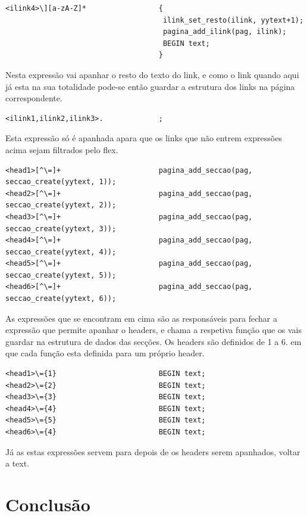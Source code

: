 \documentclass[11pt, a4paper, oneside]{article}
\begin{document}
\begin{verbatim}
<ilink4>\][a-zA-Z]*                 {
                                     ilink_set_resto(ilink, yytext+1);
                                     pagina_add_ilink(pag, ilink);
                                     BEGIN text;
                                    }
\end{verbatim}

Nesta expressão vai apanhar o resto do texto do link, e como o link quando aqui já esta na sua totalidade pode-se então guardar a estrutura dos links na página correspondente.


\begin{verbatim}
<ilink1,ilink2,ilink3>.             ;
\end{verbatim}
Esta expressão só é apanhada apara que os links que não entrem expressões acima sejam filtrados pelo flex. 



\begin{verbatim}
<head1>[^\=]+                       pagina_add_seccao(pag, seccao_create(yytext, 1));
<head2>[^\=]+                       pagina_add_seccao(pag, seccao_create(yytext, 2));
<head3>[^\=]+                       pagina_add_seccao(pag, seccao_create(yytext, 3));
<head4>[^\=]+                       pagina_add_seccao(pag, seccao_create(yytext, 4));
<head5>[^\=]+                       pagina_add_seccao(pag, seccao_create(yytext, 5));
<head6>[^\=]+                       pagina_add_seccao(pag, seccao_create(yytext, 6));
\end{verbatim}
As expressões que se encontram em cima são as responsáveis para fechar a expressão que permite apanhar o headers, e chama a respetiva função que os vais guardar na estrutura de dados das secções. Os headers são definidos de 1 a 6. em que cada função esta definida para um próprio header. 

\begin{verbatim}
<head1>\={1}                        BEGIN text;
<head2>\={2}                        BEGIN text;
<head3>\={3}                        BEGIN text;
<head4>\={4}                        BEGIN text;
<head5>\={5}                        BEGIN text;
<head6>\={4}                        BEGIN text;

\end{verbatim}
Já as estas expressões servem para depois de os headers serem apanhados, voltar a text.

\newpage
\section{Conclusão}
\end{document}
